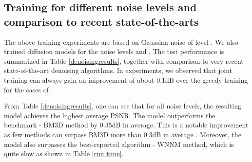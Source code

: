 \documentclass[10pt,journal,compsoc]{IEEEtran}
\begin{document}
\subsection{Training for different 
noise levels and comparison to recent state-of-the-arts}
The above training experiments are based on Gaussian noise of level . 
We also trained diffusion models for the noise levels  and . 
The test performance is summarized in Table \ref{denoisingresults}, together with comparison to very recent 
state-of-the-art denoising algorithms. 
In experiments, we observed that joint training can always gain an improvement of about 0.1dB 
over the greedy training for the cases of . 

From Table \ref{denoisingresults}, one can see that for all noise levels, 
the resulting  model achieves the highest average PSNR. 
The  model outperforms the benchmark - 
BM3D method by 0.35dB in average. This is a notable improvement as few methods can surpass BM3D more 
than 0.3dB in average \cite{levin2011natural}. Moreover, the  model also surpasses 
the best-reported algorithm - WNNM method, which is quite slow as shown in Table \ref{run time}. 

\begin{comment}
We present a detailed comparison between our learned  model and three state-of-the-art methods 
over 68 natural images for noise level  in Figure \ref{fig:comparison}, where the diagonal line  means an equal 
performance to ours. One can see that only the WNNM algorithm can outperform ours on few images. 
\end{comment}
\end{document}
